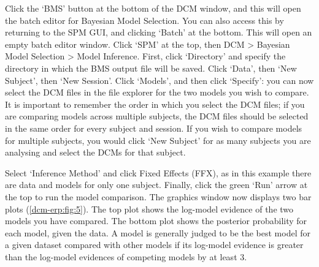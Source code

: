 Click the `BMS' button at the bottom of the DCM window, and this will
open the batch editor for Bayesian Model Selection. You can also access
this by returning to the SPM GUI, and clicking `Batch' at the bottom.
This will open an empty batch editor window. Click `SPM' at the top,
then DCM \textgreater{} Bayesian Model Selection \textgreater{} Model
Inference. First, click `Directory' and specify the directory in which
the BMS output file will be saved. Click `Data', then `New Subject',
then `New Session'. Click `Models', and then click `Specify': you can
now select the DCM files in the file explorer for the two models you
wish to compare. It is important to remember the order in which you
select the DCM files; if you are comparing models across multiple
subjects, the DCM files should be selected in the same order for every
subject and session. If you wish to compare models for multiple
subjects, you would click `New Subject' for as many subjects you are
analysing and select the DCMs for that subject.

Select `Inference Method' and click Fixed Effects (FFX), as in this
example there are data and models for only one subject. Finally, click
the green `Run' arrow at the top to run the model comparison. The
graphics window now displays two bar plots (\ref{dcm-erp:fig:5}). The
top plot shows the log-model evidence of the two models you have
compared. The bottom plot shows the posterior probability for each
model, given the data. A model is generally judged to be the best model
for a given dataset compared with other models if its log-model evidence
is greater than the log-model evidences of competing models by at least
3.

